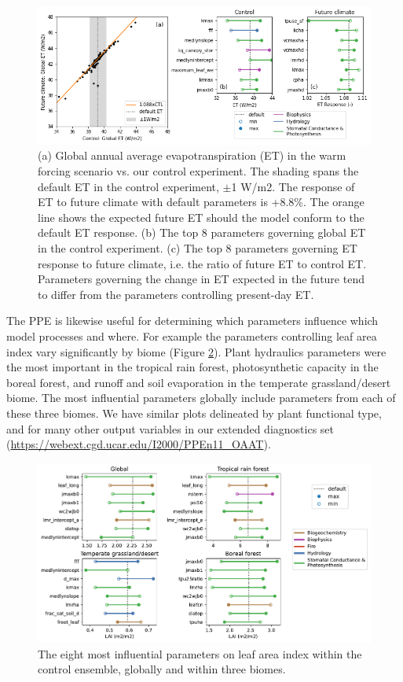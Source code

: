 \documentclass[draft]{agujournal2019}
\begin{document}
\begin{figure}[h]
\centering
\includegraphics[width=\textwidth]{../figs/ET_response.png}
\caption{(a) Global annual average evapotranspiration (ET) in the warm forcing scenario vs. our control experiment. The shading spans the default ET in the control experiment, $\pm$1 W/m2. The response of ET to future climate with default parameters is +8.8\%. The orange line shows the expected future ET should the model conform to the default ET response. 
(b) The top 8 parameters governing global ET in the control experiment.
(c) The top 8 parameters governing ET response to future climate, i.e. the ratio of future ET to control ET.
Parameters governing the change in ET expected in the future tend to differ from the parameters controlling present-day ET.}
\label{fig:et}
\end{figure}

The PPE is likewise useful for determining which parameters influence which model processes and where. For example the parameters controlling leaf area index vary significantly by biome (Figure \ref{fig:lai}). Plant hydraulics parameters were the most important in the tropical rain forest, photosynthetic capacity in the boreal forest, and runoff and soil evaporation in the temperate grassland/desert biome. The most influential parameters globally include parameters from each of these three biomes. We have similar plots delineated by plant functional type, and for many other output variables in our extended diagnostics set (\url{https://webext.cgd.ucar.edu/I2000/PPEn11_OAAT}). 

\begin{figure}[h]
\centering
\includegraphics[width=\textwidth]{../figs/lai_biome.pdf}
\caption{The eight most influential parameters on leaf area index within the control ensemble, globally and within three biomes.}
\label{fig:lai}
\end{figure}
\end{document}
